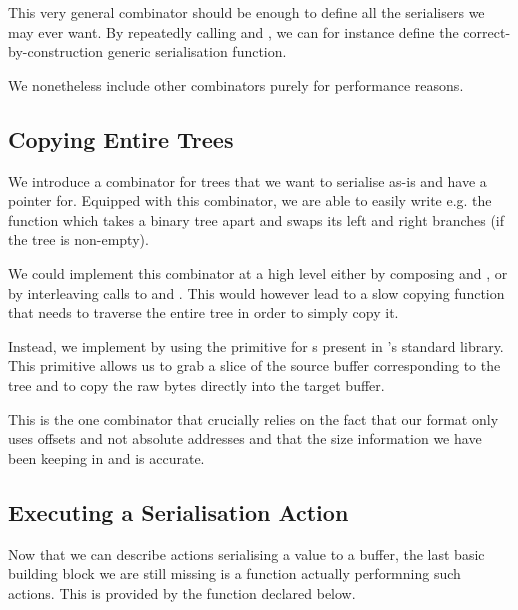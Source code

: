This very general combinator should be enough to define all the
serialisers we may ever want.
%
By repeatedly calling  and \IdrisFunction{(\#)}, we can
for instance define the correct-by-construction generic serialisation function.


We nonetheless include other combinators purely for performance reasons.

\subsection{Copying Entire Trees}

We introduce a  combinator for trees that we want to
serialise as-is and have a pointer for.
%
Equipped with this combinator, we are able to easily write e.g.
the  function which takes a binary tree apart
and swaps its left and right branches (if the tree is non-empty).


We could implement this combinator at a high level either by composing
 and ,
or by interleaving calls to  and \IdrisFunction{(\#)}.
%
This would however lead to a slow copying function that needs to
traverse the entire tree in order to simply copy it.

Instead, we implement  by using the
 primitive for s
present in \idris{}'s standard library.
%
This primitive allows us to grab a slice of the source buffer
corresponding to the tree
and to copy the raw bytes directly into the target buffer.


This is the one combinator that crucially relies on the fact that our format
only uses offsets and not absolute addresses
and that the size information we have been keeping in  and
 is accurate.

\subsection{Executing a Serialisation Action}

Now that we can describe actions serialising a value to a buffer,
the last basic building block we are still missing is a function actually
performning such actions.
%
This is provided by the  function
declared below.

